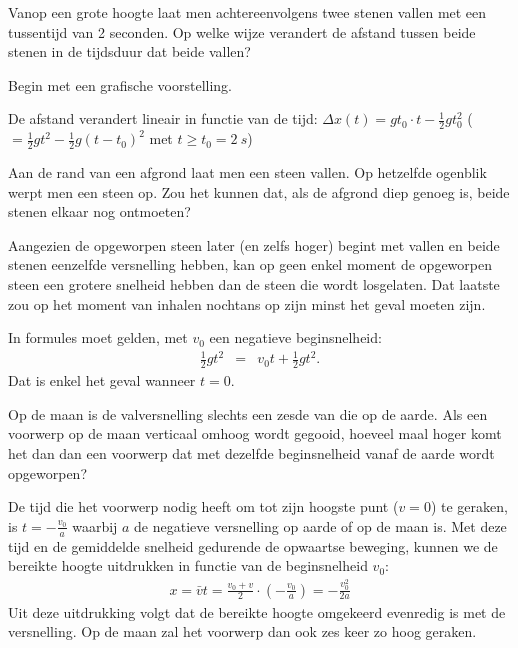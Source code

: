 \documentclass{ximera}
\begin{document}
\begin{exercise}
	Vanop een grote hoogte laat men achtereenvolgens twee stenen vallen met een tussentijd van 2 seconden. Op welke wijze verandert de afstand tussen beide stenen in de tijdsduur dat beide vallen?
	\begin{hint}
		Begin met een grafische voorstelling.
	\end{hint}
	\begin{oplossing}
		De afstand verandert lineair in functie van de tijd: $\Delta x(t)=gt_0\cdot t-\frac{1}{2}gt_0^2$ ($=\frac{1}{2}gt^2-\frac{1}{2}g(t-t_0)^2$ met $t\geq t_0=\SI{2}{s}$)
	\end{oplossing}
\end{exercise}

\begin{exercise}
	Aan de rand van een afgrond laat men een steen vallen. Op hetzelfde ogenblik werpt men een steen op. Zou het kunnen dat, als de afgrond diep genoeg is, beide stenen elkaar nog ontmoeten?

	\begin{oplossing}
		Aangezien de opgeworpen steen later (en zelfs hoger) begint met vallen en beide stenen eenzelfde versnelling hebben, kan op geen enkel moment de opgeworpen steen een grotere snelheid hebben dan de steen die wordt losgelaten. Dat laatste zou op het moment van inhalen nochtans op zijn minst het geval moeten zijn.

		In formules moet gelden, met $v_0$ een negatieve beginsnelheid:
		\begin{eqnarray*}
			\frac{1}{2}gt^2&=&v_0t+\frac{1}{2}gt^2.
		\end{eqnarray*}
		Dat is enkel het geval wanneer $t=0$.
	\end{oplossing}
\end{exercise}

\begin{exercise}
	Op de maan is de valversnelling slechts een zesde van die op de aarde. Als een voorwerp op de maan verticaal omhoog wordt gegooid, hoeveel maal hoger komt het dan dan een voorwerp dat met dezelfde beginsnelheid vanaf de aarde wordt opgeworpen?

	\begin{oplossing}
		De tijd die het voorwerp nodig heeft om tot zijn hoogste punt ($v=0$) te geraken, is $t=-\frac{v_0}{a}$ waarbij $a$ de negatieve versnelling op aarde of op de maan is. Met deze tijd en de gemiddelde snelheid gedurende de opwaartse beweging, kunnen we de bereikte hoogte uitdrukken in functie van de beginsnelheid $v_0$:
		\begin{eqnarray*}
			x=\bar{v}t=\frac{v_0+v}{2}\cdot\left(-\frac{v_0}{a}\right)=-\frac{v_0^2}{2a}
		\end{eqnarray*}
		Uit deze uitdrukking volgt dat de bereikte hoogte omgekeerd evenredig is met de versnelling. Op de maan zal het voorwerp dan ook zes keer zo hoog geraken.
	\end{oplossing}
\end{exercise}
\end{document}
